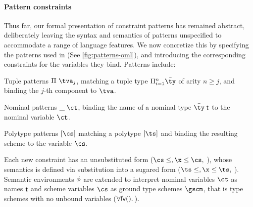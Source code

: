 \documentclass[acmsmall,screen,nonacm]{acmart}
\begin{document}
\paragraph{Pattern constraints}

Thus far, our formal presentation of constraint patterns has remained
abstract, deliberately leaving the syntax and semantics of patterns unspecified to
accommodate a range of language features. We now concretize this by specifying
the patterns used in \OML (See \cref{fig:patterns-oml}), and introducing the
corresponding constraints for the variables they bind.
%
Patterns include:
\begin{enumerate*}

  \item Tuple patterns $\cpatprod \tv j$, matching a tuple type $\Pi\iton
    \tys$ of arity $n \geq j$, and binding the $j$-th component to $\tv$.

  \item Nominal patterns $\cpatrcd \ct$, binding the name of a nominal type
    $\tys \Tapp$ to the nominal variable $\ct$.

  \item Polytype patterns $\cpatpoly \cs$ matching a polytype $\tpoly \ts$ and
    binding the resulting scheme to the variable $\cs$.

\end{enumerate*}

Each new constraint has an unsubstituted form ($\cs \leq \t, \x \leq \cs,$
\etc), whose semantics is defined via substitution into a sugared form ($\ts
\leq \t, \x \leq \ts,$ \etc). Semantic environments $\phi$ are extended to
interpret nominal variables $\ct$ as names $\mathrel{\mathsf{t}}\mathclose{}$ and scheme variables $\cs$ as
ground type schemes $\gscm$, that is type schemes with no unbound variables
(\ie $\forall {\mathsf{fv}({\relax})}.\,{\relax}$).
\end{document}
